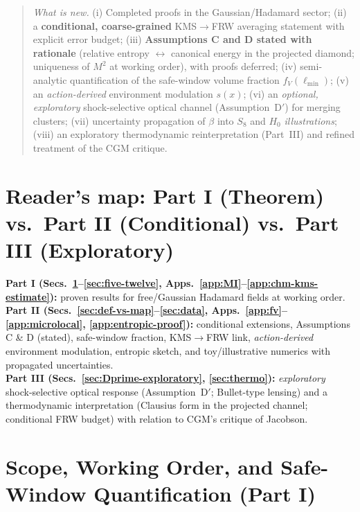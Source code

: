 \documentclass[aps,prd,onecolumn,superscriptaddress,nofootinbib]{revtex4-2}
\begin{document}
\begin{abstract}
\smallskip
\emph{What is new.} (i) Completed proofs in the Gaussian/Hadamard sector; (ii) a \textbf{conditional, coarse-grained} KMS\(\to\)FRW averaging statement with explicit error budget; (iii) \textbf{Assumptions C and D stated with rationale} (relative entropy \(\leftrightarrow\) canonical energy in the projected diamond; uniqueness of \(M^2\) at working order), with proofs deferred; (iv) semi-analytic quantification of the safe-window volume fraction \(f_V(\ell_{\min})\); (v) an \emph{action-derived} environment modulation \(s(x)\); (vi) an \emph{optional, exploratory} shock-selective optical channel (Assumption~D$'$) for merging clusters; (vii) uncertainty propagation of \(\beta\) into \(S_8\) and \(H_0\) \emph{illustrations}; (viii) an exploratory thermodynamic reinterpretation (Part~III) and refined treatment of the CGM critique.
\end{abstract}

\maketitle

\section*{Reader’s map: Part I (Theorem) vs.\ Part II (Conditional) vs.\ Part III (Exploratory)}
\noindent \textbf{Part I (Secs.~\ref{sec:scope}–\ref{sec:five-twelve}, Apps.~\ref{app:MI}–\ref{app:chm-kms-estimate}):} proven results for free/Gaussian Hadamard fields at working order.\\
\textbf{Part II (Secs.~\ref{sec:def-vs-map}–\ref{sec:data}, Apps.~\ref{app:fv}–\ref{app:microlocal}, \ref{app:entropic-proof}):} conditional extensions, Assumptions C \& D (stated), safe-window fraction, KMS\(\to\)FRW link, \emph{action-derived} environment modulation, entropic sketch, and toy/illustrative numerics with propagated uncertainties.\\
\textbf{Part III (Secs.~\ref{sec:Dprime-exploratory}, \ref{sec:thermo}):} \emph{exploratory} shock-selective optical response (Assumption~D$'$; Bullet-type lensing) and a thermodynamic interpretation (Clausius form in the projected channel; conditional FRW budget) with relation to CGM’s critique of Jacobson.

\section{Scope, Working Order, and Safe-Window Quantification (Part I)}
\label{sec:scope}
\end{document}
